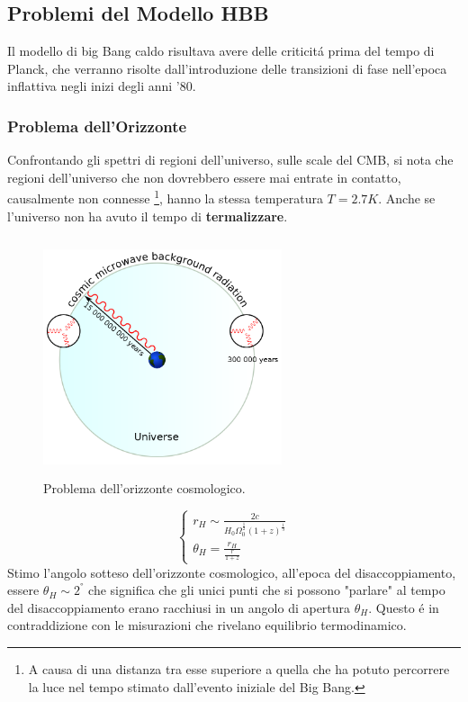 \documentclass[12pt, a4paper]{article}
\begin{document}
\subsection{Problemi del Modello HBB}
Il modello di big Bang caldo risultava avere delle criticit\'{a} prima del tempo di Planck, che verranno risolte dall'introduzione delle transizioni di fase nell'epoca inflattiva negli inizi degli anni '80.
\subsubsection{Problema dell'Orizzonte}
Confrontando gli spettri di regioni dell'universo, sulle scale del CMB, si nota che regioni dell'universo che non dovrebbero essere mai entrate in contatto, causalmente non connesse \footnote{A causa di una distanza tra esse superiore a quella che ha potuto percorrere la luce nel tempo stimato dall'evento iniziale del Big Bang.}, hanno la stessa temperatura $T=2.7K$. Anche se l'universo non ha avuto il tempo di \textbf{termalizzare}.
\begin{figure}[htp]
    \centering
    \includegraphics[width=7cm, height=7cm]{images/orizzonte.png}
    \caption{Problema dell'orizzonte cosmologico.}
    \label{fig:orizzonte}
\end{figure}
\begin{equation}
    \begin{cases}
   r_H\sim \frac{2c}{H_0 \Omega_0^{\frac{1}{2}} (1+z)^{\frac{1}{3}}}
    \\
   \theta_H=\frac{r_H}{\frac{r}{1+z}}
    \end{cases}
\end{equation}
Stimo l'angolo sotteso dell'orizzonte cosmologico, all'epoca del disaccoppiamento, essere $\theta_H\sim 2^°$ che significa che gli unici punti che si possono "parlare" al tempo del disaccoppiamento erano racchiusi in un angolo di apertura $\theta_H$. Questo \'{e} in contraddizione con le misurazioni che rivelano equilibrio termodinamico.
\end{document}

